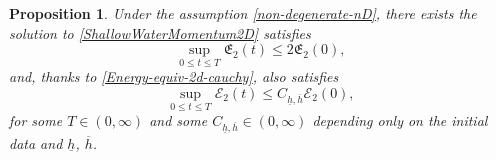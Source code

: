 \documentclass[reqno,11pt]{amsart}
\newcommand{\norm}[2]{\Vert #1 \Vert_{#2}}
\DeclareMathOperator{\curl}{curl}
\theoremstyle{plain}
\newtheorem{proposition}[theorem]{Proposition}
\theoremstyle{definition}
\numberwithin{equation}{section}
\begin{document}
\begin{proposition}
    Under the assumption \eqref{non-degenerate-nD}, there exists the solution to \eqref{ShallowWaterMomentum2D} satisfies
    \begin{equation}
        \sup_{0\leq t\leq T} \mathfrak{E}_2(t)\leq 2\mathfrak{E}_2(0),
        \end{equation}
        and, thanks to \eqref{Energy-equiv-2d-cauchy}, also satisfies        \begin{equation}
          \sup_{0\leq t\leq T}  \mathcal{E}_2(t)\leq C_{\underline{h},\overline{h}} \mathcal{E}_2(0),
        \end{equation}
        for some $T\in (0,\infty)$ and some $C_{\underline{h},\overline{h}}\in (0,\infty) $ depending only on the initial data and $\underline{h}$, $\overline{h}$.
\end{proposition}
\end{document}
